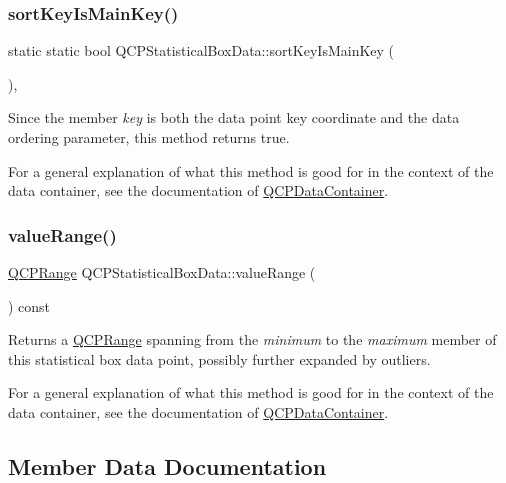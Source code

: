 \subsubsection{\texorpdfstring{sortKeyIsMainKey()}{sortKeyIsMainKey()}}
{\footnotesize\ttfamily static static bool Q\+C\+P\+Statistical\+Box\+Data\+::sort\+Key\+Is\+Main\+Key (\begin{DoxyParamCaption}{ }\end{DoxyParamCaption})\hspace{0.3cm}{\ttfamily [inline]}, {\ttfamily [static]}}

Since the member {\itshape key} is both the data point key coordinate and the data ordering parameter, this method returns true.

For a general explanation of what this method is good for in the context of the data container, see the documentation of \mbox{\hyperlink{class_q_c_p_data_container}{Q\+C\+P\+Data\+Container}}. \mbox{\label{class_q_c_p_statistical_box_data_a1a2410fcf3d45fa3a1ad09e265b9bcad}} 
\subsubsection{\texorpdfstring{valueRange()}{valueRange()}}
{\footnotesize\ttfamily \mbox{\hyperlink{class_q_c_p_range}{Q\+C\+P\+Range}} Q\+C\+P\+Statistical\+Box\+Data\+::value\+Range (\begin{DoxyParamCaption}{ }\end{DoxyParamCaption}) const\hspace{0.3cm}{\ttfamily [inline]}}

Returns a \mbox{\hyperlink{class_q_c_p_range}{Q\+C\+P\+Range}} spanning from the {\itshape minimum} to the {\itshape maximum} member of this statistical box data point, possibly further expanded by outliers.

For a general explanation of what this method is good for in the context of the data container, see the documentation of \mbox{\hyperlink{class_q_c_p_data_container}{Q\+C\+P\+Data\+Container}}. 

\subsection{Member Data Documentation}
\mbox{\label{class_q_c_p_statistical_box_data_a2d0b5ca5130e8a73294c46b8b2fd77b8}} 
